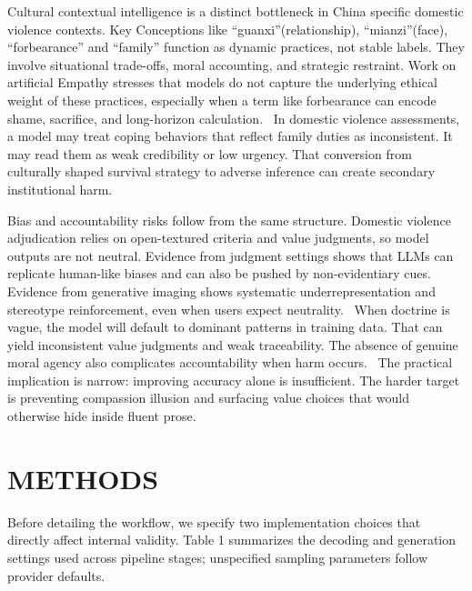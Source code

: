 {{{{{Cultural contextual intelligence is a distinct bottleneck in China specific domestic violence contexts. Key Conceptions like ``guanxi''(relationship), ``mianzi''(face), ``forbearance'' and ``family'' function as dynamic practices, not stable labels. They involve situational trade-offs, moral accounting, and strategic restraint. Work on artificial Empathy stresses that models do not capture the underlying ethical weight of these practices, especially when a term like forbearance can encode shame, sacrifice, and long-horizon calculation.~\cite{ref77} In domestic violence assessments, a model may treat coping behaviors that reflect family duties as inconsistent. It may read them as weak credibility or low urgency. That conversion from culturally shaped survival strategy to adverse inference can create secondary institutional harm.

Bias and accountability risks follow from the same structure. Domestic violence adjudication relies on open-textured criteria and value judgments, so model outputs are not neutral. Evidence from judgment settings shows that LLMs can replicate human-like biases and can also be pushed by non-evidentiary cues.~\cite{ref78} Evidence from generative imaging shows systematic underrepresentation and stereotype reinforcement, even when users expect neutrality.~\cite{ref79} When doctrine is vague, the model will default to dominant patterns in training data. That can yield inconsistent value judgments and weak traceability. The absence of genuine moral agency also complicates accountability when harm occurs.~\cite{ref80} The practical implication is narrow: improving accuracy alone is insufficient. The harder target is preventing compassion illusion and surfacing value choices that would otherwise hide inside fluent prose.

\hypertarget{methods}{%
\section{METHODS}\label{methods}

Before detailing the workflow, we specify two implementation choices that directly affect internal validity. Table 1 summarizes the decoding and generation settings used across pipeline stages; unspecified sampling parameters follow provider defaults.

}}}}}}
